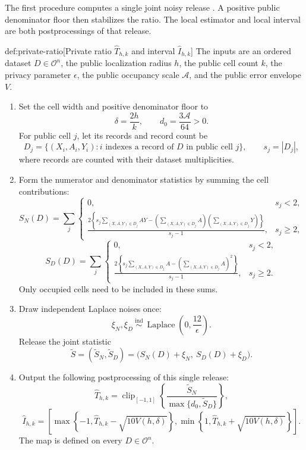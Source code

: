 \documentclass[11pt]{article}
\begin{document}
The first procedure computes a single joint noisy release . A positive public denominator floor  then stabilizes the ratio. The local estimator  and local interval  are both postprocessings of that release.
\begin{algorithmv}{def:private-ratio}[Private ratio \(\widehat T_{h,k}\) and interval \(\widehat I_{h,k}\)]
The inputs are an ordered dataset \(D\in\mathcal O^n\), the public localization radius \(h\), the public cell count \(k\), the privacy parameter \(\epsilon\), the public occupancy scale \(\mathcal A\), and the public error envelope \(V\).
\begin{enumerate}
\item Set the cell width and positive denominator floor to
\[
\delta=\frac{2h}{k},
\qquad
d_0=\frac{3\mathcal A}{64}>0.
\]
For public cell \(j\), let its records and record count be
\[
D_j=\{(X_i,A_i,Y_i):i\text{ indexes a record of }D
\text{ in public cell }j\},
\qquad
s_j=|D_j|,
\]
where records are counted with their dataset multiplicities.

\item Form the numerator and denominator statistics by summing the cell contributions:
\[
S_N(D)=
\sum_j
\begin{cases}
0,&s_j<2,\\[2pt]
\displaystyle
\frac{2\left\{
s_j\sum_{(X,A,Y)\in D_j}AY
-\left(\sum_{(X,A,Y)\in D_j}A\right)
 \left(\sum_{(X,A,Y)\in D_j}Y\right)
\right\}}{s_j-1},&s_j\ge2,
\end{cases}
\]
\[
S_D(D)=
\sum_j
\begin{cases}
0,&s_j<2,\\[2pt]
\displaystyle
\frac{2\left\{
s_j\sum_{(X,A,Y)\in D_j}A
-\left(\sum_{(X,A,Y)\in D_j}A\right)^2
\right\}}{s_j-1},&s_j\ge2.
\end{cases}
\]
Only occupied cells need to be included in these sums.

\item Draw independent Laplace noises once:
\[
\xi_N,\xi_D\ \stackrel{\mathrm{ind}}{\sim}\
\operatorname{Laplace}\!\left(0,\frac{12}{\epsilon}\right).
\]
Release the joint statistic
\[
\widetilde S
=
(\widetilde S_N,\widetilde S_D)
=
\bigl(S_N(D)+\xi_N,\ S_D(D)+\xi_D\bigr).
\]

\item Output the following postprocessing of this single release:
\[
\widehat T_{h,k}
=
\operatorname{clip}_{[-1,1]}
\left\{
\frac{\widetilde S_N}
{\max\{d_0,\widetilde S_D\}}
\right\},
\]
\[
\widehat I_{h,k}
=
\left[
\max\left\{-1,\widehat T_{h,k}-\sqrt{10V(h,\delta)}\right\},
\min\left\{1,\widehat T_{h,k}+\sqrt{10V(h,\delta)}\right\}
\right].
\]
The map is defined on every \(D\in\mathcal O^n\).
\end{enumerate}
\end{algorithmv}
\end{document}
